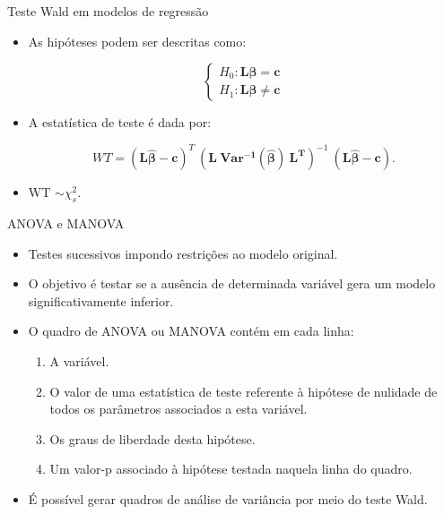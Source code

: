 \documentclass[
  ignorenonframetext,
  serif,
  professionalfont,
  usenames,
  dvipsnames,
  aspectratio = 169]{beamer}
\begin{document}
\begin{frame}{Teste Wald em modelos de regressão}
\protect\hypertarget{teste-wald-em-modelos-de-regressuxe3o-2}{}
\begin{itemize}

  \itemsep 2ex
  
  \item As hipóteses podem ser descritas como:

$$
\left\{\begin{matrix}
H_0: \boldsymbol{L}\boldsymbol{\beta} = \boldsymbol{c} \\ 
H_1: \boldsymbol{L}\boldsymbol{\beta} \neq \boldsymbol{c}
\end{matrix}\right.
$$

  \item A estatística de teste é dada por:

$$
WT = (\boldsymbol{L\hat\beta} - \boldsymbol{c})^T \ (\boldsymbol{L \ Var^{-1}(\hat\beta) \ L^T})^{-1} \ (\boldsymbol{L\hat\beta} - \boldsymbol{c}).
$$

 \item  WT $\sim \chi^2_s$.

\end{itemize}
\end{frame}

\begin{frame}{ANOVA e MANOVA}
\protect\hypertarget{anova-e-manova}{}
\begin{itemize}

  \itemsep 2ex

  \item Testes sucessivos impondo restrições ao modelo original. 

  \item O objetivo é testar se a ausência de determinada variável gera um modelo significativamente inferior. 

  \item O quadro de ANOVA ou MANOVA contém em cada linha: 
    \begin{enumerate}
      \item A variável. 
      \item O valor de uma estatística de teste referente à hipótese de nulidade de todos os parâmetros associados a esta variável. 
      \item Os graus de liberdade desta hipótese. 
      \item Um valor-p associado à hipótese testada naquela linha do quadro.
    \end{enumerate}

  \item É possível gerar quadros de análise de variância por meio do teste Wald.

  \end{itemize}
\end{frame}
\end{document}

